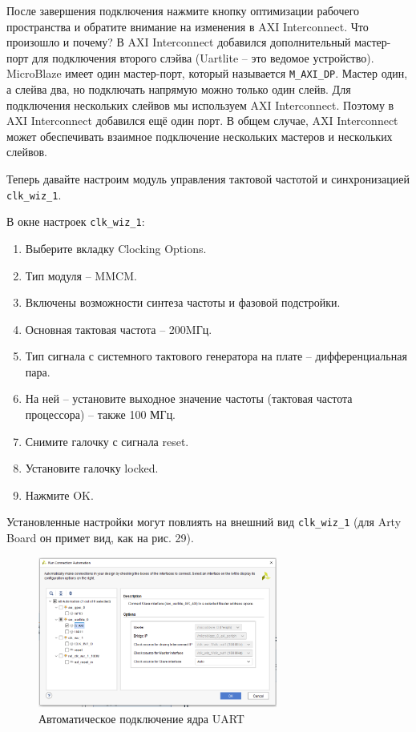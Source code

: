 \documentclass[a4paper,oneside ,14pt]{extreport}
\begin{document}
После завершения подключения нажмите кнопку оптимизации рабочего 
пространства и обратите внимание на изменения в AXI
Interconnect. Что произошло и почему? В AXI Interconnect добавился дополнительный 
мастер-порт для подключения второго слэйва (Uartlite – это ведомое устройство). 
MicroBlaze имеет один мастер-порт, который называется  \verb|M_AXI_DP|. Мастер один, 
а слейва два, но подключать напрямую можно только один слейв. Для подключения
нескольких слейвов мы используем AXI Interconnect. Поэтому в AXI Interconnect
добавился ещё один порт. В общем случае, AXI Interconnect может 
обеспечивать взаимное подключение нескольких мастеров и нескольких слейвов.

Теперь давайте настроим модуль управления тактовой 
частотой и синхронизацией  \verb|clk_wiz_1|. 

В окне настроек  \verb|clk_wiz_1|:
\begin{enumerate}
	\item Выберите вкладку Clocking Options.
	\item Тип модуля – MMCM.
	\item Включены возможности синтеза частоты и фазовой подстройки.
	\item Основная тактовая частота – 200MГц.
	\item Тип сигнала с системного тактового генератора на плате –
дифференциальная пара.
	\item На ней – установите выходное значение частоты (тактовая частота 
процессора) – также 100 МГц.
	\item Снимите галочку с сигнала reset.
	\item Установите галочку locked.
	\item Нажмите OK.
\end{enumerate}

Установленные настройки могут повлиять на внешний вид \verb|clk_wiz_1| (для Arty
Board он примет вид, как на рис. 29).

\begin{figure}[!ht]
	\centering
	\includegraphics[width=0.7\textwidth]{image/m_28.png}
	\caption{Автоматическое подключение ядра UART}
	\label{m_28}
\end{figure}
\end{document}
